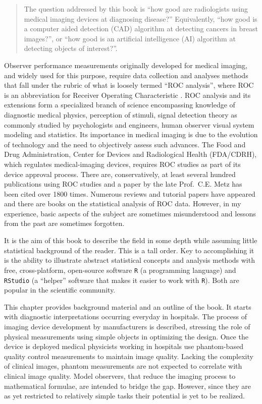 \documentclass[
]{book}
\begin{document}
\begin{quote}
The question addressed by this book is ``how good are radiologists using medical imaging devices at diagnosing disease?'' Equivalently, ``how good is a computer aided detection (CAD) algorithm at detecting cancers in breast images?'', or ``how good is an artificial intelligence (AI) algorithm at detecting objects of interest?''.
\end{quote}

Observer performance measurements originally developed for medical imaging, and widely used for this purpose, require data collection and analyses methods that fall under the rubric of what is loosely termed ``ROC analysis'', where ROC is an abbreviation for Receiver Operating Characteristic \citep{metz1978rocmethodology}. ROC analysis and its extensions form a specialized branch of science encompassing knowledge of diagnostic medical physics, perception of stimuli, signal detection theory as commonly studied by psychologists and engineers, human observer visual system modeling and statistics. Its importance in medical imaging is due to the evolution of technology and the need to objectively assess such advances. The Food and Drug Administration, Center for Devices and Radiological Health (FDA/CDRH), which regulates medical-imaging devices, requires ROC studies as part of its device approval process. There are, conservatively, at least several hundred publications using ROC studies and a paper \citep{metz1978rocmethodology} by the late Prof.~C.E. Metz has been cited over 1800 times. Numerous reviews and tutorial papers have appeared \citep[\citet{metz1989some}, \citet{kundel2008receiver}, \citet{metz1986rocmethodology}]{metz1978rocmethodology} and there are books on the statistical analysis \citep{RN1443} of ROC data. However, in my experience, basic aspects of the subject are sometimes misunderstood and lessons from the past are sometimes forgotten.

It is the aim of this book to describe the field in some depth while assuming little statistical background of the reader. This is a tall order. Key to accomplishing it is the ability to illustrate abstract statistical concepts and analysis methods with free, cross-platform, open-source software \texttt{R} (a programming language) and \texttt{RStudio} (a ``helper'' software that makes it easier to work with \texttt{R}). Both are popular in the scientific community.

This chapter provides background material and an outline of the book. It starts with diagnostic interpretations occurring everyday in hospitals. The process of imaging device development by manufacturers is described, stressing the role of physical measurements using simple objects in optimizing the design. Once the device is deployed medical physicists working in hospitals use phantom-based quality control measurements to maintain image quality. Lacking the complexity of clinical images, phantom measurements are not expected to correlate with clinical image quality. Model observers, that reduce the imaging process to mathematical formulae, are intended to bridge the gap. However, since they are as yet restricted to relatively simple tasks their potential is yet to be realized.
\end{document}
